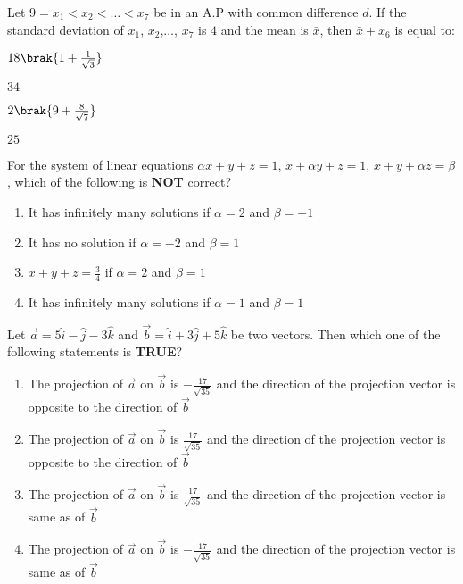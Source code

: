 \iffalse
\title{2023}
\author{EE24Btech11024}
\section{mcq-single}
\fi

\item Let $9=x_1<x_2<\dots <x_7$ be in an A.P with common difference $d$. If the standard deviation of $x_1$, $x_2$,$\dots$, $x_7$ is $4$ and the mean is $\bar{x}$, then $\bar{x}+x_6$ is equal to:

\hfill{}
\begin{enumerate}
\begin{multicols}{4}
\item $18\brak{1+\frac{1}{\sqrt{3}}}$
\item $34$
\item $2\brak{9+\frac{8}{\sqrt{7}}}$
\item $25$
\end{multicols}
\end{enumerate}

\item For the system of linear equations $\alpha x+y+z=1$, $x+\alpha y+z=1$, $x+y+\alpha z=\beta$, which of the following is \textbf{NOT} correct?

\hfill{}
\begin{enumerate}
\item It has infinitely many solutions if $\alpha=2$ and $\beta=-1$
\item It has no solution if $\alpha=-2$ and $\beta=1$
\item $x+y+z=\frac{3}{4}$ if $\alpha=2$ and $\beta=1$
\item It has infinitely many solutions if $\alpha=1$ and $\beta=1$
\end{enumerate}

\item Let $\vec{a}=5\hat{i}-\hat{j}-3\hat{k}$ and $\vec{b}=\hat{i}+3\hat{j}+5\hat{k}$ be two vectors. Then which one of the following statements is \textbf{TRUE}?

\hfill{}
\begin{enumerate}
\item The projection of $\vec{a}$ on $\vec{b}$ is $-\frac{17}{\sqrt{35}}$ and the direction of the projection vector is opposite to the direction of $\vec{b}$	
\item The projection of $\vec{a}$ on $\vec{b}$ is $\frac{17}{\sqrt{35}}$ and the direction of the projection vector is opposite to the direction of $\vec{b}$
\item The projection of $\vec{a}$ on $\vec{b}$ is $\frac{17}{\sqrt{35}}$ and the direction of the projection vector is same as of $\vec{b}$ 
\item The projection of $\vec{a}$ on $\vec{b}$ is $-\frac{17}{\sqrt{35}}$ and the direction of the projection vector is same as of $\vec{b}$
\end{enumerate}

